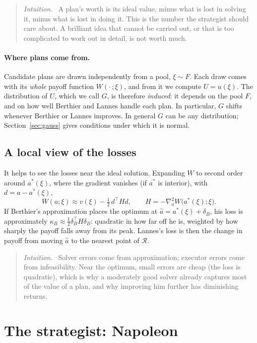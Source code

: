 \documentclass[11pt]{article}
\newcommand{\Nap}{\textcolor{nap}{Napoleon}}
\newcommand{\Ber}{\textcolor{ber}{Berthier}}
\newcommand{\Lan}{\textcolor{lan}{Lannes}}
\theoremstyle{remark}
\newenvironment{intuition}{\begin{quote}\small\color{muted}\textit{Intuition.}\ }{\end{quote}}
\newcommand{\Rcal}{\mathcal{R}}
\begin{document}
\begin{intuition}
A plan's worth is its ideal value, minus what is lost in solving it, minus what is lost in doing it. This is the number the strategist should care about. A brilliant idea that cannot be carried out, or that is too complicated to work out in detail, is not worth much.
\end{intuition}

\paragraph{Where plans come from.} Candidate plans are drawn independently from a pool, $\xi\sim F$. Each draw comes with its \emph{whole} payoff function $W(\cdot\,;\xi)$, and from it we compute $U=u(\xi)$. The distribution of $U$, which we call $G$, is therefore \emph{induced}: it depends on the pool $F$, and on how well \Ber{} and \Lan{} handle each plan. In particular, $G$ shifts whenever \Ber{} or \Lan{} improves. In general $G$ can be any distribution; Section~\ref{sec:gauss} gives conditions under which it is normal.

\subsection{A local view of the losses}

It helps to see the losses near the ideal solution. Expanding $W$ to second order around $a^*(\xi)$, where the gradient vanishes (if $a^*$ is interior), with $d=a-a^*(\xi)$,
\[
W(a;\xi)\approx v(\xi)-\tfrac12\,d^{\top}Hd,\qquad H=-\nabla_a^2W\big(a^*(\xi);\xi\big).
\]
If \Ber's approximation places the optimum at $\hat a=a^*(\xi)+\delta_B$, his loss is approximately $\kappa_B\approx\tfrac12\delta_B^{\top}H\delta_B$: quadratic in how far off he is, weighted by how sharply the payoff falls away from its peak. \Lan's loss is then the change in payoff from moving $\hat a$ to the nearest point of $\Rcal$.

\begin{intuition}
Solver errors come from approximation; executor errors come from infeasibility. Near the optimum, small errors are cheap (the loss is quadratic), which is why a moderately good solver already captures most of the value of a plan, and why improving him further has diminishing returns.
\end{intuition}

\section{\texorpdfstring{The strategist: \Nap}{The strategist: Napoleon}}
\end{document}
